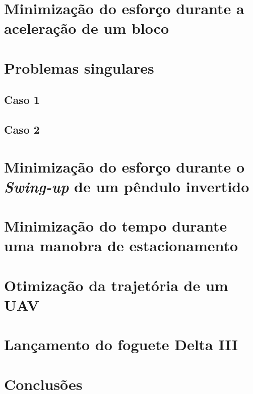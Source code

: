 

\section{Minimização do esforço durante a aceleração de um bloco}
\label{sec:resultados:integrador}


\label{sec:resultados:singulares}
\section{Problemas singulares}


\subsection{Caso 1}
\label{sec:resultados:singular1}


\subsection{Caso 2}
\label{sec:resultados:singular2}


\section{Minimização do esforço durante o \textit{Swing-up} de um pêndulo invertido}
\label{sec:resultados:penduloInvertido}


\section{Minimização do tempo durante uma manobra de estacionamento}
\label{sec:resultados:estacionamento}


\section{Otimização da trajetória de um UAV}
\label{sec:resultados:uav}


\section{Lançamento do foguete Delta III}
\label{sec:resultados:foguete}


\section{Conclusões}
